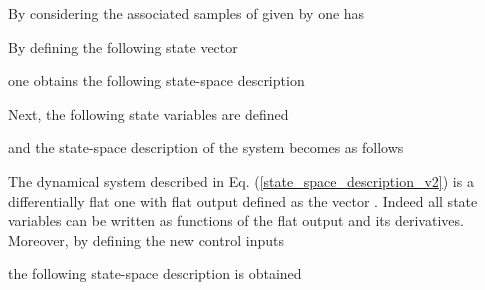 \documentclass[journal]{IEEEtran}
\begin{document}
\noindent By considering the associated samples of  given by 
one has



\noindent By defining the following state vector



\noindent one obtains the following state-space description



\noindent Next, the following state variables are defined



\noindent and the state-space description of the system becomes as follows



\noindent The dynamical system described in Eq. (\ref{state_space_description_v2}) is a differentially flat one with flat output defined as the vector . Indeed all state variables can be written as functions of the flat output and its derivatives. \\

\noindent Moreover, by defining the new control inputs



\noindent the following state-space description is obtained

\\
\end{document}
